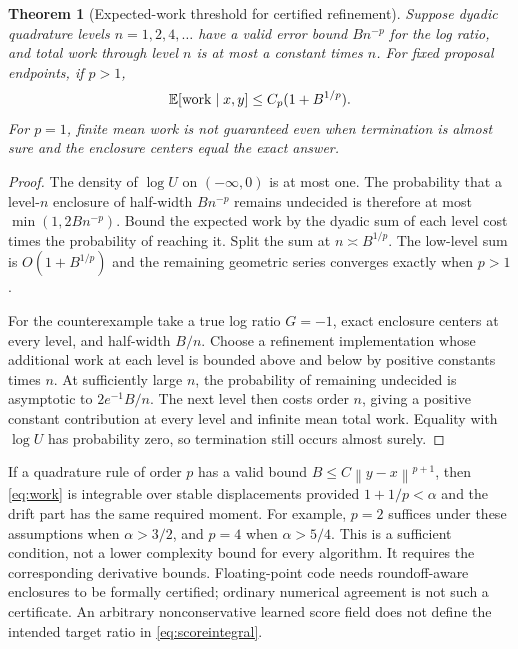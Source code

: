 \documentclass[11pt]{article}
\newtheorem{theorem}{Theorem}[section]
\theoremstyle{definition}\newtheorem{definition}[theorem]{Definition}
\theoremstyle{remark}\newtheorem{remark}[theorem]{Remark}
\numberwithin{equation}{section}
\newcommand{\norm}[1]{\left\lVert#1\right\rVert}\newcommand{\TV}{\mathrm{TV}}
\newcommand{\1}{\mathbf 1}
\begin{document}
\begin{theorem}[Expected-work threshold for certified refinement]\label{thm:work}
Suppose dyadic quadrature levels $n=1,2,4,\ldots$ have a valid error bound $Bn^{-p}$ for the log ratio, and total work through level $n$ is at most a constant times $n$. For fixed proposal endpoints, if $p>1$,
\begin{equation}
\mathbb E[\mathrm{work}\mid x,y]\le C_p(1+B^{1/p}).\label{eq:work}
\end{equation}
For $p=1$, finite mean work is not guaranteed even when termination is almost sure and the enclosure centers equal the exact answer.
\end{theorem}
\begin{proof}
The density of $\log U$ on $(-\infty,0)$ is at most one. The probability that a level-$n$ enclosure of half-width $Bn^{-p}$ remains undecided is therefore at most $\min(1,2Bn^{-p})$. Bound the expected work by the dyadic sum of each level cost times the probability of reaching it. Split the sum at $n\asymp B^{1/p}$. The low-level sum is $O(1+B^{1/p})$ and the remaining geometric series converges exactly when $p>1$.

For the counterexample take a true log ratio $G=-1$, exact enclosure centers at every level, and half-width $B/n$. Choose a refinement implementation whose additional work at each level is bounded above and below by positive constants times $n$. At sufficiently large $n$, the probability of remaining undecided is asymptotic to $2e^{-1}B/n$. The next level then costs order $n$, giving a positive constant contribution at every level and infinite mean total work. Equality with $\log U$ has probability zero, so termination still occurs almost surely.
\end{proof}
If a quadrature rule of order $p$ has a valid bound $B\le C\norm{y-x}^{p+1}$, then \eqref{eq:work} is integrable over stable displacements provided $1+1/p<\alpha$ and the drift part has the same required moment. For example, $p=2$ suffices under these assumptions when $\alpha>3/2$, and $p=4$ when $\alpha>5/4$. This is a sufficient condition, not a lower complexity bound for every algorithm. It requires the corresponding derivative bounds. Floating-point code needs roundoff-aware enclosures to be formally certified; ordinary numerical agreement is not such a certificate. An arbitrary nonconservative learned score field does not define the intended target ratio in \eqref{eq:scoreintegral}.
\end{document}
